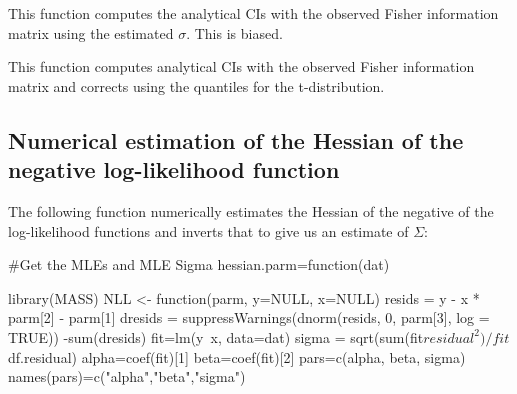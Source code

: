 {This function computes the analytical CIs with the observed Fisher information matrix using the estimated $\sigma$. This is biased.
\begin{Schunk}
\end{Schunk}

This function computes analytical CIs with the observed Fisher information matrix and corrects using the quantiles for the t-distribution.
\begin{Schunk}
\end{Schunk}

\subsection{Numerical estimation of the Hessian of the negative log-likelihood function}

The following function numerically estimates the Hessian of the negative of the log-likelihood functions and inverts that to give us an estimate of $\Sigma$:
\begin{Schunk}
\begin{Sinput}
 #Get the MLEs and MLE Sigma
 hessian.parm=function(dat){
   library(MASS)
   NLL <- function(parm, y=NULL, x=NULL) {
     resids = y - x * parm[2] - parm[1]
     dresids = suppressWarnings(dnorm(resids, 0, parm[3], log = TRUE))
     -sum(dresids)
   }
   fit=lm(y~x, data=dat)
   sigma = sqrt(sum(fit$residual^2)/fit$df.residual)
   alpha=coef(fit)[1]
   beta=coef(fit)[2]
   pars=c(alpha, beta, sigma)
   names(pars)=c("alpha","beta","sigma")
   
}
\end{Sinput}
\end{Schunk}}
